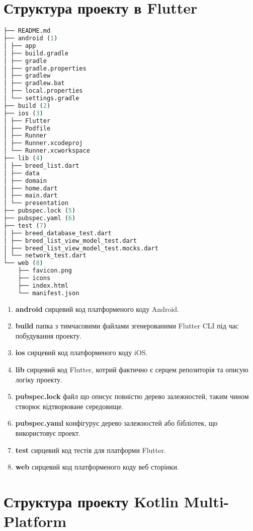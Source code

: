 \section{Структура проекту в Flutter}
\label{sec:flutter_structure_app}

\begin{lstlisting}[style=light, language=Python,label={lst:flutter_project_layout},caption=Flutter Project Layout]
├── README.md
├── android (1)
│ ├── app
│ ├── build.gradle
│ ├── gradle
│ ├── gradle.properties
│ ├── gradlew
│ ├── gradlew.bat
│ ├── local.properties
│ └── settings.gradle
├── build (2)
├── ios (3)
│ ├── Flutter
│ ├── Podfile
│ ├── Runner
│ ├── Runner.xcodeproj
│ └── Runner.xcworkspace
├── lib (4)
│ ├── breed_list.dart
│ ├── data
│ ├── domain
│ ├── home.dart
│ ├── main.dart
│ └── presentation
├── pubspec.lock (5)
├── pubspec.yaml (6)
├── test (7)
│ ├── breed_database_test.dart
│ ├── breed_list_view_model_test.dart
│ ├── breed_list_view_model_test.mocks.dart
│ └── network_test.dart
└── web (8)
    ├── favicon.png
    ├── icons
    ├── index.html
    └── manifest.json
\end{lstlisting}

\begin{enumerate}
    \item \textbf{android} сирцевий код платформеного коду Android.
    \item \textbf{build} папка з тимчасовими файлами згенерованими Flutter CLI під час побудування проекту.
    \item \textbf{ios} сирцевий код платформеного коду iOS.
    \item \textbf{lib} сирцевий код Flutter, котрий фактично є серцем репозиторія та описую логіку проекту.
    \item \textbf{pubspec.lock} файл що описує повністю дерево залежностей, таким чином створює відтворюване середовище.
    \item \textbf{pubspec.yaml} конфігурує дерево залежностей або бібліотек, що використовує проект.
    \item \textbf{test} сирцевий код тестів для платформи Flutter.
    \item \textbf{web} сирцевий код платформеного коду веб сторінки.
\end{enumerate}


\section{Структура проекту Kotlin Multi-Platform}
\label{sec:kmm_structure_app}

